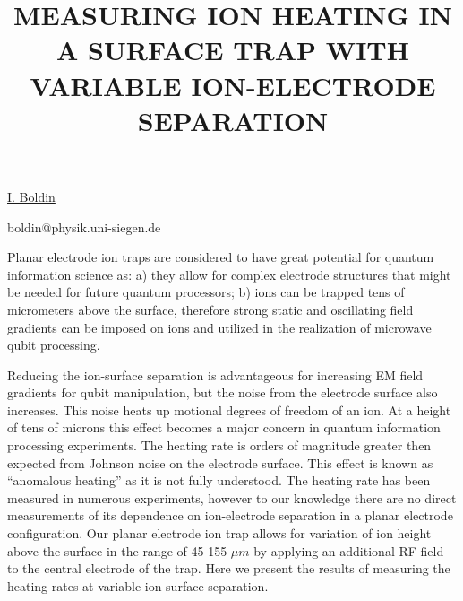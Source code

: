 \title{MEASURING ION HEATING IN A SURFACE TRAP WITH VARIABLE ION-ELECTRODE SEPARATION}

\underline{I. Boldin} 

{\normalsize{\vspace{-4mm}
\siegen

\email boldin@physik.uni-siegen.de}}

Planar electrode ion traps are considered to have great potential for quantum information science as: a) they allow for complex electrode structures that might be needed for future quantum processors; b) ions can be trapped tens of micrometers above the surface, therefore strong static and oscillating field gradients can be imposed on ions and utilized in the realization of microwave qubit processing.

Reducing the ion-surface separation is advantageous for increasing EM field gradients for qubit manipulation, but the noise from the electrode surface also increases. This noise heats up motional degrees of freedom of an ion. At a height of tens of microns this effect becomes a major concern in quantum information processing experiments. The heating rate is orders of magnitude greater then expected from Johnson noise on the electrode surface. This effect is known as ``anomalous heating'' as it is not fully understood.
The heating rate has been measured in numerous experiments, however to our knowledge there are no direct measurements of its dependence on ion-electrode separation in a planar electrode configuration. Our planar electrode ion trap allows for variation of ion height above the surface in the range of 45-155 $\mu m$ by applying an additional RF field to the central electrode of the trap. Here we present the results of measuring the heating rates at variable ion-surface separation.


\vspace{\baselineskip} 